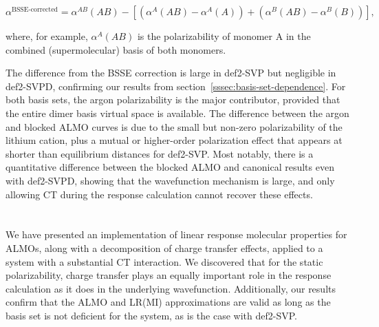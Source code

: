\begin{equation}
  \alpha^{\text{BSSE-corrected}} = \alpha^{AB}(AB) - \left[ \left( \alpha^{A}(AB) - \alpha^{A}(A) \right) + \left( \alpha^{B}(AB) - \alpha^{B}(B) \right) \right],
  \label{eq:bsse-corrected-polarizability}
\end{equation}

where, for example, \(\alpha^{A}(AB)\) is the polarizability of monomer A in the combined (supermolecular) basis of both monomers.

The difference from the BSSE correction is large in def2-SVP but negligible in def2-SVPD, confirming our results from section~\ref{sssec:basis-set-dependence}. For both basis sets, the argon polarizability is the major contributor, provided that the entire dimer basis virtual space is available. The difference between the argon and blocked ALMO curves is due to the small but non-zero polarizability of the lithium cation, plus a mutual or higher-order polarization effect that appears at shorter than equilibrium distances for def2-SVP. Most notably, there is a quantitative difference between the blocked ALMO and canonical results even with def2-SVPD, showing that the wavefunction mechanism is large, and only allowing CT during the response calculation cannot recover these effects.

\section{\texorpdfstring{}{Conclusions and Future Work}}
\label{sec:conclusions-and-future-work}

We have presented an implementation of linear response molecular properties for ALMOs, along with a decomposition of charge transfer effects, applied to a system with a substantial CT interaction. We discovered that for the static polarizability, charge transfer plays an equally important role in the response calculation as it does in the underlying wavefunction. Additionally, our results confirm that the ALMO and LR(MI) approximations are valid as long as the basis set is not deficient for the system, as is the case with def2-SVP.

